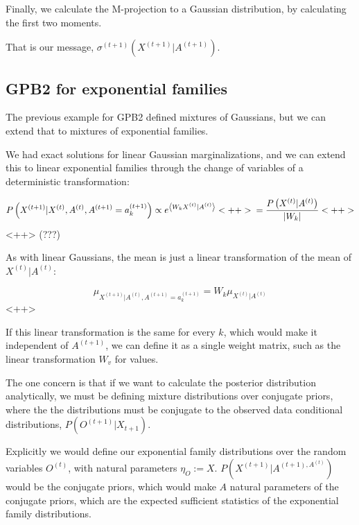 \documentclass[a4paper]{article}
\begin{document}
Finally, we calculate the M-projection to a Gaussian distribution, by calculating the first two moments.

That is our message, $\sigma^{(t+1)} \left( X^{(t+1)} \vert A^{(t+1)} \right)$.

\subsection{GPB2 for exponential families}

The previous example for GPB2 defined mixtures of Gaussians, but we can extend that to mixtures of exponential families.  

We had exact solutions for linear Gaussian marginalizations, and we can extend this to linear exponential families through the change of variables of a deterministic transformation:

\begin{equation}
  P \left( X^{(t+1)} \vert X^{(t)}, A^{(t)}, A^{(t+1)} = a_k^{(t+1)} \right) \propto e^{ \left< W_k X^{(t)} \vert A^{(t)}\right> }<++> \\
  = \frac{P\left( X^{(t)} \vert A^{(t)} \right) }{ \lvert W_k \rvert}<++> 
  \label{<++>}
\end{equation}<++>
(???)

As with linear Gaussians, the mean is just a linear transformation of the mean of $X^{(t)} \vert A^{(t)}$:

\begin{equation}
  \mu_{ X^{(t+1)} \vert A^{(t)}, A^{(t+1)} = a_k^{(t+1)} } = W_k \mu_{X^{(t)} \vert A^{(t)}}
  \label{<++>}
\end{equation}<++>

If this linear transformation is the same for every $k$, which would make it independent of $A^{(t+1)}$, we can define it as a single weight matrix, such as the linear transformation $W_v$ for values.

The one concern is that if we want to calculate the posterior distribution analytically, we must be defining mixture distributions over conjugate priors, where the the distributions must be conjugate to the observed data conditional distributions, $P \left( O^{(t+1)} \vert X_{t+1} \right)$.

Explicitly we would define our exponential family distributions over the random variables $O^{(t)}$, with natural parameters $ \eta_O := X $.  
$ P \left( X^{(t+1)} \vert A^{(t+1), A^{(t)} } \right)$ would be the conjugate priors, which would make $A$ natural parameters of the conjugate priors, which are the expected sufficient statistics of the exponential family distributions.
\end{document}
